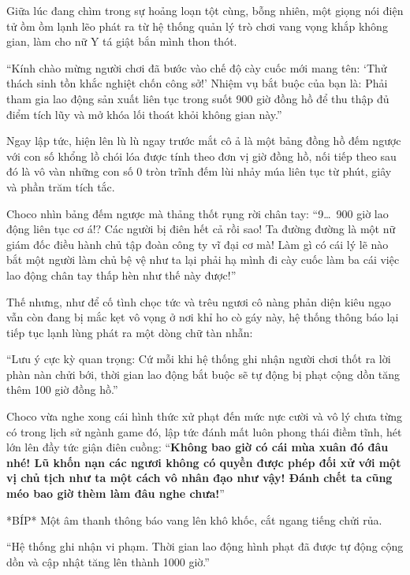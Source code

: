 \documentclass[../main.tex]{subfiles}
\begin{document}
Giữa lúc đang chìm trong sự hoảng loạn tột cùng, bỗng nhiên, một giọng nói điện tử ồm ồm lạnh lẽo phát ra từ hệ thống quản lý trò chơi vang vọng khắp không gian, làm cho nữ Y tá giật bắn mình thon thót.

\begin{center}
  ``Kính chào mừng người chơi đã bước vào chế độ cày cuốc mới mang tên: `Thử thách sinh tồn khắc nghiệt chốn công sở!' Nhiệm vụ bắt buộc của bạn là: Phải tham gia lao động sản xuất liên tục trong suốt 900 giờ đồng hồ để thu thập đủ điểm tích lũy và mở khóa lối thoát khỏi không gian này.''
\end{center}

Ngay lập tức, hiện lên lù lù ngay trước mắt cô ả là một bảng đồng hồ đếm ngược với con số {} khổng lồ chói lóa được tính theo đơn vị giờ đồng hồ, nối tiếp theo sau đó là vô vàn những con số 0 tròn trĩnh đếm lùi nhảy múa liên tục từ phút, giây và phần trăm tích tắc.

Choco nhìn bảng đếm ngược mà thảng thốt rụng rời chân tay: ``9\dots\ 900 giờ lao động liên tục cơ á!? Các người bị điên hết cả rồi sao! Ta đường đường là một nữ giám đốc điều hành chủ tập đoàn công ty vĩ đại cơ mà! Làm gì có cái lý lẽ nào bắt một người làm chủ bệ vệ như ta lại phải hạ mình đi cày cuốc làm ba cái việc lao động chân tay thấp hèn như thế này được!''

Thế nhưng, như để cố tình chọc tức và trêu ngươi cô nàng phản diện kiêu ngạo vẫn còn đang bị mắc kẹt vô vọng ở nơi khỉ ho cò gáy này, hệ thống thông báo lại tiếp tục lạnh lùng phát ra một dòng chữ tàn nhẫn:

\begin{center}
  ``Lưu ý cực kỳ quan trọng: Cứ mỗi khi hệ thống ghi nhận người chơi thốt ra lời phàn nàn chửi bới, thời gian lao động bắt buộc sẽ tự động bị phạt cộng dồn tăng thêm 100 giờ đồng hồ.''
\end{center}

Choco vừa nghe xong cái hình thức xử phạt đến mức nực cười và vô lý chưa từng có trong lịch sử ngành game đó, lập tức đánh mất luôn phong thái điềm tĩnh, hét lớn lên đầy tức giận điên cuồng: ``\textbf{Không bao giờ có cái mùa xuân đó đâu nhé! Lũ khốn nạn các ngươi không có quyền được phép đối xử với một vị chủ tịch như ta một cách vô nhân đạo như vậy! Đánh chết ta cũng méo bao giờ thèm làm đâu nghe chưa!}''

*BÍP* Một âm thanh thông báo vang lên khô khốc, cắt ngang tiếng chửi rủa.

\begin{center}
  ``Hệ thống ghi nhận vi phạm. Thời gian lao động hình phạt đã được tự động cộng dồn và cập nhật tăng lên thành 1000 giờ.''
\end{center}
\end{document}
